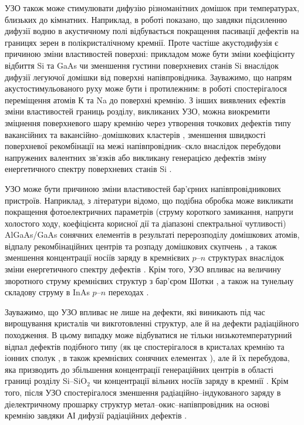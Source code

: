 УЗО також може стимулювати дифузію різноманітних домішок при температурах, близьких до кімнатних.
Наприклад, в роботі \cite{Ostapenko1999} показано, що завдяки підсиленню дифузії водню в акустичному полі відбувається покращення пасивації дефектів на границях зерен в полікристалічному кремнії.
Проте частіше акустодифузія є причиною зміни властивостей поверхні:
прикладом може бути зміни коефіцієнту відбиття Si та GaAs \cite{Zaver} чи зменшення густини поверхневих станів Si \cite{Zaver:2008r} внаслідок дифузії легуючої домішки від поверхні напівпровідника.
Зауважимо, що напрям акустостимульованого руху може бути і протилежним:
в роботі \cite{Ostrov2002FTPr} спостерігалося переміщення атомів К та Na до поверхні кремнію.
З інших виявлених ефектів зміни властивостей границь розділу, викликаних УЗО,
можна виокремити зміцнення поверхневого шару кремнію через утворення точкових дефектів типу вакансійних та вакансійно--домішкових кластерів \cite{Ostrov2000FTPr},
зменшення швидкості поверхневої рекомбінації на межі напівпровідник--скло внаслідок перебудови напружених валентних зв'язків \cite{Vlasov2009r} або викликану генерацією дефектів зміну енергетичного спектру поверхневих станів Si \cite{Zaver:2008r}.

УЗО може бути причиною зміни властивостей бар'єрних напівпровідникових пристроїв.
Наприклад, з літератури відомо, що подібна обробка може викликати покращення фотоелектричних параметрів (струму короткого замикання, напруги холостого ходу, коефіцієнта корисної дії та діапазоні спектральної чутливості) AlGaAs/GaAs сонячних елементів в результаті перерозподілу домішкових атомів, відпалу рекомбінаційних центрів та розпаду домішкових скупчень \cite{Zaver2005}, а також зменшення концентрації носіїв заряду в кремнієвих $p$--$n$ структурах внаслідок зміни енергетичного спектру дефектів \cite{Davletova2008}.
Крім того, УЗО впливає на величину зворотного струму кремнієвих структур з бар'єром Шотки \cite{Tagaev}, а також на тунельну складову струму в InAs $p$--$n$ переходах \cite{Teterkin2009r}.

Зауважимо, що УЗО впливає не лише на дефекти, які виникають під час вирощування кристалів чи викготовленні структур, але й на дефекти радіаційного походження.
В цьому випадку може відбуватися не тільки низькотемпературний відпал дефектів подібного типу (як це спостерігалося в кристалах кремнію \cite{PodolHivr} та іонних сполук \cite{UST:OstrovCsI}, в також кремнієвих сонячних елементах \cite{YOlikh2007TPLr}), але й їх перебудова, яка призводить до збільшення концентрації генераційних центрів в області границі розділу Si--SiO$_2$  \cite{Parchinskii2006r} чи концентрації вільних носіїв заряду в кремнії \cite{YOlikh2006TPLr}.
Крім того, після УЗО спостерігалося зменшення радіаційно--індукованого заряду в діелектричному прошарку структур метал--окис--напівпровідник на основі кремнію завдяки АІ дифузії радіаційних дефектів \cite{Parchinskii2000r}.


